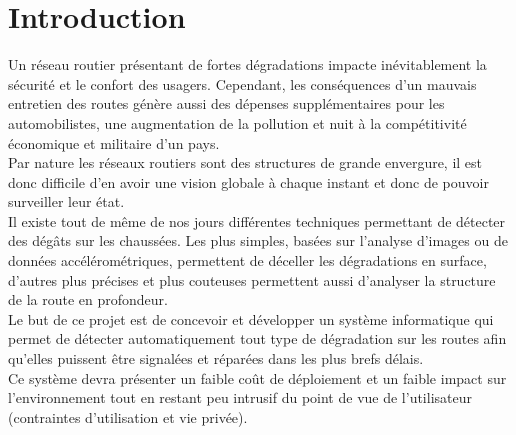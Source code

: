 \section{Introduction}
Un réseau routier présentant de fortes dégradations impacte inévitablement la
sécurité et le confort des usagers. Cependant, les conséquences d'un mauvais
entretien des routes génère aussi des dépenses supplémentaires pour les
automobilistes, une augmentation de la pollution et nuit à la compétitivité
économique et militaire d'un pays.\\

Par nature les réseaux routiers sont des structures de grande envergure, il est
donc difficile d'en avoir une vision globale à chaque instant et donc de
pouvoir surveiller leur état.\\
Il existe tout de même de nos jours différentes techniques permettant de
détecter des dégâts sur les chaussées. Les plus simples, basées sur l'analyse
d'images ou de données accélérométriques, permettent de déceller les
dégradations en surface, d'autres plus précises et plus couteuses permettent
aussi d'analyser la structure de la route en profondeur.\\

Le but de ce projet est de concevoir et développer un système informatique qui
permet de détecter automatiquement tout type de dégradation sur les routes afin
qu'elles puissent être signalées et réparées dans les plus brefs délais.\\
Ce système devra présenter un faible coût de déploiement et un faible impact sur
l'environnement tout en restant peu intrusif du point de vue de l'utilisateur
(contraintes d'utilisation et vie privée).